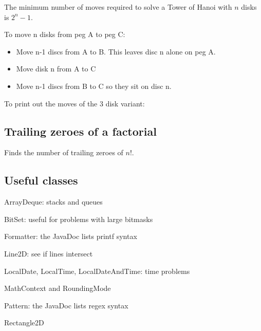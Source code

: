 The minimum number of moves required to solve a Tower of Hanoi with $n$ disks is $2^n - 1$.

To move n disks from peg A to peg C:

\begin{itemize}
    \item Move n-1 discs from A to B. This leaves disc n alone on peg A.
    \item Move disk n from A to C
    \item Move n-1 discs from B to C so they sit on disc n.
\end{itemize}

To print out the moves of the 3 disk variant:



\subsection*{Trailing zeroes of a factorial}

Finds the number of trailing zeroes of $n!$.



\subsection*{Useful classes}

ArrayDeque: stacks and queues

BitSet: useful for problems with large bitmasks

Formatter: the JavaDoc lists printf syntax

Line2D: see if lines intersect

LocalDate, LocalTime, LocalDateAndTime: time problems

MathContext and RoundingMode

Pattern: the JavaDoc lists regex syntax

Rectangle2D

\newpage